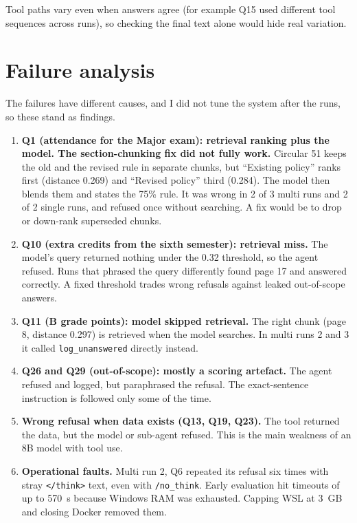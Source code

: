 \documentclass[10pt,a4paper]{article}
\newcommand{\code}[1]{\texttt{\small #1}}
\begin{document}
Tool paths vary even when answers agree (for example Q15 used different tool sequences across runs), so checking the final text alone would hide real variation.

\section{Failure analysis}

The failures have different causes, and I did not tune the system after the runs, so these stand as findings.

\begin{enumerate}
\item \textbf{Q1 (attendance for the Major exam): retrieval ranking plus the model. The section-chunking fix did not fully work.} Circular 51 keeps the old and the revised rule in separate chunks, but ``Existing policy'' ranks first (distance 0.269) and ``Revised policy'' third (0.284). The model then blends them and states the 75\% rule. It was wrong in 2 of 3 multi runs and 2 of 2 single runs, and refused once without searching. A fix would be to drop or down-rank superseded chunks.
\item \textbf{Q10 (extra credits from the sixth semester): retrieval miss.} The model's query returned nothing under the 0.32 threshold, so the agent refused. Runs that phrased the query differently found page 17 and answered correctly. A fixed threshold trades wrong refusals against leaked out-of-scope answers.
\item \textbf{Q11 (B grade points): model skipped retrieval.} The right chunk (page 8, distance 0.297) is retrieved when the model searches. In multi runs 2 and 3 it called \code{log\_unanswered} directly instead.
\item \textbf{Q26 and Q29 (out-of-scope): mostly a scoring artefact.} The agent refused and logged, but paraphrased the refusal. The exact-sentence instruction is followed only some of the time.
\item \textbf{Wrong refusal when data exists (Q13, Q19, Q23).} The tool returned the data, but the model or sub-agent refused. This is the main weakness of an 8B model with tool use.
\item \textbf{Operational faults.} Multi run 2, Q6 repeated its refusal six times with stray \code{</think>} text, even with \code{/no\_think}. Early evaluation hit timeouts of up to 570~s because Windows RAM was exhausted. Capping WSL at 3~GB and closing Docker removed them.
\end{enumerate}
\end{document}
